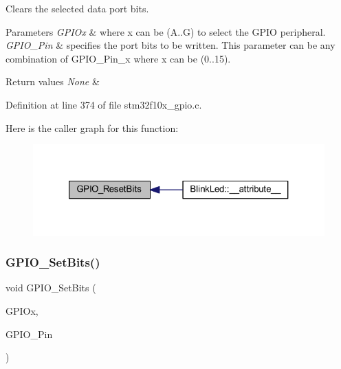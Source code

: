 Clears the selected data port bits. 


\begin{DoxyParams}{Parameters}
{\em G\+P\+I\+Ox} & where x can be (A..G) to select the G\+P\+IO peripheral. \\
\hline
{\em G\+P\+I\+O\+\_\+\+Pin} & specifies the port bits to be written. This parameter can be any combination of G\+P\+I\+O\+\_\+\+Pin\+\_\+x where x can be (0..15). \\
\hline
\end{DoxyParams}

\begin{DoxyRetVals}{Return values}
{\em None} & \\
\hline
\end{DoxyRetVals}


Definition at line 374 of file stm32f10x\+\_\+gpio.\+c.

Here is the caller graph for this function\+:
\nopagebreak
\begin{figure}[H]
\begin{center}
\leavevmode
\includegraphics[width=321pt]{group___g_p_i_o___private___functions_ga6fcd35b207a66608dd2c9d7de9247dc8_icgraph}
\end{center}
\end{figure}
\mbox{\label{group___g_p_i_o___private___functions_ga9e1352eed7c6620e18af2d86f6b6ff8e}} 
\subsubsection{\texorpdfstring{G\+P\+I\+O\+\_\+\+Set\+Bits()}{GPIO\_SetBits()}}
{\footnotesize\ttfamily void G\+P\+I\+O\+\_\+\+Set\+Bits (\begin{DoxyParamCaption}\item[{\hyperlink{struct_g_p_i_o___type_def}{G\+P\+I\+O\+\_\+\+Type\+Def} $\ast$}]{G\+P\+I\+Ox,  }\item[{uint16\+\_\+t}]{G\+P\+I\+O\+\_\+\+Pin }\end{DoxyParamCaption})}



